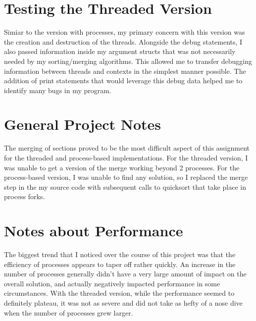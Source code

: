 \documentclass{article}%
\begin{document}
\section{Testing the Threaded Version}

Simiar to the version with processes, my primary concern with this version was the creation and destruction of the threads. Alongside the debug statements, I also passed information inside my argument structs that was not necessarily needed by my sorting/merging algorithms. This allowed me to transfer debugging information between threads and contexts in the simplest manner possible. The addition of print statements that would leverage this debug data helped me to identify many bugs in my program.

\section{General Project Notes}

The merging of sections proved to be the most difficult aspect of this assignment for the threaded and process-based implementations. For the threaded version, I was unable to get a version of the merge working beyond 2 processes. For the process-based version, I was unable to find any solution, so I replaced the merge step in the my source code with subsequent calls to quicksort that take place in process forks.

\section{Notes about Performance}

The biggest trend that I noticed over the course of this project was that the efficiency of processes appears to taper off rather quickly. An increase in the number of processes generally didn't have a very large amount of impact on the overall solution, and actually negatively impacted performance in some circumstances. With the threaded version, while the performance seemed to definitely plateau, it was not as severe and did not take as hefty of a nose dive when the number of processes grew larger.
\end{document}
